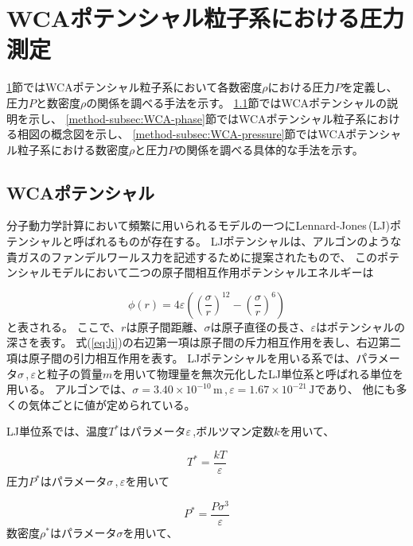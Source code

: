 \documentclass[titlepage]{jsreport}
\begin{document}
\section{WCAポテンシャル粒子系における圧力測定}\label{method-sec:WCA-press}
\ref{method-sec:WCA-press}節ではWCAポテンシャル粒子系において各数密度$\rho$における圧力$P$を定義し、圧力$P$と数密度$\rho$の関係を調べる手法を示す。
\ref{method-subsec:WCA}節ではWCAポテンシャルの説明を示し、
\ref{method-subsec:WCA-phase}節ではWCAポテンシャル粒子系における相図の概念図を示し、
\ref{method-subsec:WCA-pressure}節ではWCAポテンシャル粒子系における数密度$\rho$と圧力$P$の関係を調べる具体的な手法を示す。


\subsection{WCAポテンシャル}\label{method-subsec:WCA}
分子動力学計算において頻繁に用いられるモデルの一つにLennard-Jones\,(LJ)ポテンシャルと呼ばれるものが存在する。
LJポテンシャルは、アルゴンのような貴ガスのファンデルワールス力を記述するために提案\cite{Lennard_Jones_1931}されたもので、
このポテンシャルモデルにおいて二つの原子間相互作用ポテンシャルエネルギーは

\large
\begin{equation}
\phi(r)=4{\varepsilon}\left(\left(\frac{\sigma}{r}\right)^{12}-\left(\frac{\sigma}{r}\right)^6\right)\label{eq:lj}
\end{equation}
\normalsize
と表される。
ここで、$r$は原子間距離、${\sigma}$は原子直径の長さ、${\varepsilon}$はポテンシャルの深さを表す。
式(\ref{eq:lj})の右辺第一項は原子間の斥力相互作用を表し、右辺第二項は原子間の引力相互作用を表す。
LJポテンシャルを用いる系では、パラメータ$\sigma$\,,\,$\varepsilon$と粒子の質量$m$を用いて物理量を無次元化したLJ単位系と呼ばれる単位を用いる。
アルゴンでは、${\sigma}=3.40×10^{-10}\,\mathrm{m}$\,,\,${\varepsilon}=1.67×10^{-21}\,\mathrm{J}$であり\cite{argon-parameters}、
他にも多くの気体ごとに値が定められている\cite{graphane-parameters,many-parameters}。

\newpage
LJ単位系では、温度$T^*$はパラメータ$\varepsilon$\,,ボルツマン定数$k$を用いて、

\large
\begin{equation}
T^*=\frac{kT}{\varepsilon}\label{eq:T}
\end{equation}
\normalsize
圧力$P^*$はパラメータ${\sigma}$\,,\,${\varepsilon}$を用いて

\large
\begin{equation}
P^*=\frac{P\sigma^3}{\varepsilon}\label{eq:P}
\end{equation}
\normalsize
数密度$\rho^*$はパラメータ$\sigma$を用いて、
\end{document}
